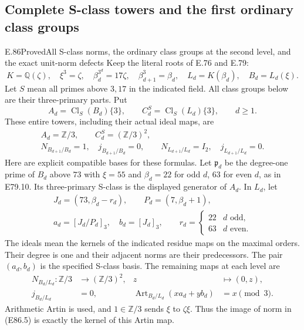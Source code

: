 \subsection{Complete S-class towers and the first ordinary class groups}

\begin{statement}{E.86}{Proved}{All S-class norms, the ordinary class groups at the second level, and the exact unit-norm defects}
Keep the literal roots of E.76 and E.79:
\[
 K=\mathbb Q(\zeta),\quad \xi^3=\zeta,\quad
 \beta_d^{3^d}=17\zeta,\quad \beta_{d+1}^3=\beta_d,
 \quad L_d=K(\beta_d),\quad B_d=L_d(\xi).
 \tag{E86.1}
\]
Let $S$ mean all primes above $3,17$ in the indicated field.
All class groups below are their three-primary parts. Put
\[
 A_d=\operatorname{Cl}_{S}(B_d)\{3\},\qquad
 C_d^S=\operatorname{Cl}_{S}(L_d)\{3\},\qquad d\ge1.
 \tag{E86.2}
\]
These entire towers, including their actual ideal maps, are
\[
 \begin{gathered}
 A_d=\mathbb Z/3,\qquad C_d^S=(\mathbb Z/3)^2,\\
 N_{B_{d+1}/B_d}=1,\quad j_{B_{d+1}/B_d}=0,
 \qquad N_{L_{d+1}/L_d}=I_2,\quad j_{L_{d+1}/L_d}=0.
 \end{gathered}
 \tag{E86.3}
\]
Here are explicit compatible bases for these formulas. Let
$\mathfrak p_d$ be the degree-one prime of $B_d$ above $73$
with $\xi=55$ and $\beta_d=22$ for odd $d$, $63$ for even
$d$, as in E79.10. Its three-primary S-class is the displayed
generator of $A_d$. In $L_d$, let
\[
 \begin{gathered}
 J_d=(73,\beta_d-r_d),\qquad
 P_d=(7,\beta_d+1),\\
 a_d=[J_d/P_d]_3,\quad b_d=[J_d]_3,\qquad
 r_d=\begin{cases}22&d\text{ odd},\\63&d\text{ even}.
 \end{cases}
 \end{gathered}
 \tag{E86.4}
\]
The ideals mean the kernels of the indicated residue maps on
the maximal orders. Their degree is one and their adjacent
norms are their predecessors. The pair $(a_d,b_d)$ is the
specified S-class basis. The remaining maps at each level are
\[
 \begin{aligned}
 N_{B_d/L_d}:\mathbb Z/3&\longrightarrow(\mathbb Z/3)^2,
                    &z&\longmapsto(0,z),\\
 j_{B_d/L_d}&=0,&
 \operatorname{Art}_{B_d/L_d}(x a_d+y b_d)&=x\pmod3.
 \end{aligned}
 \tag{E86.5}
\]
Arithmetic Artin is used, and $1\in\mathbb Z/3$ sends
$\xi$ to $\zeta\xi$. Thus the image of norm in (E86.5) is
exactly the kernel of this Artin map.


\end{statement}
